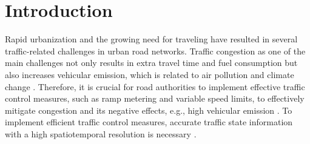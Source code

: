 \documentclass[english]{kththesis}
\begin{document}




\renewcommand{\chaptermark}[1]{ \markboth{#1}{}} 

\tableofcontents
  \markboth{\contentsname}{}
\cleardoublepage

\listoffigures
\cleardoublepage

\listoftables
\cleardoublepage


\printglossary[type=\acronymtype, title={List of acronyms and abbreviations}]
\label{pg:lastPageofPreface}

\mainmatter

\renewcommand{\chaptermark}[1]{\markboth{#1}{}}
\chapter{Introduction}
\label{ch:introduction}

Rapid urbanization and the growing need for traveling have resulted in several traffic-related challenges in urban road networks. Traffic congestion as one of the main challenges not only results in extra travel time and fuel consumption but also increases vehicular emission, which is related to air pollution and climate change \cite{barth_co2, seo_tse}. Therefore, it is crucial for road authorities to implement effective traffic control measures, such as ramp metering and variable speed limits, to effectively mitigate congestion and its negative effects, e.g., high vehicular emission \cite{seo_tse, tsanakas_emission_estimation}. To implement efficient traffic control measures, accurate traffic state information with a high spatiotemporal resolution is necessary \cite{seo_tse}.
\end{document}
